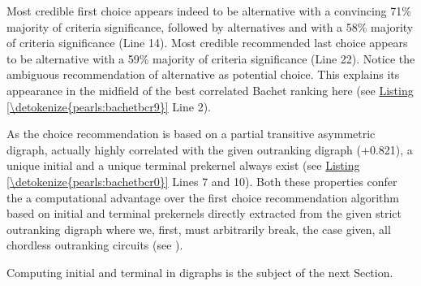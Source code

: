 \documentclass[a4paper,12pt,english]{sphinxhowto}
\begin{document}
\sphinxAtStartPar
Most credible first choice appears indeed to be alternative  with a convincing 71\% majority of criteria significance, followed by alternatives  and  with a 58\% majority of criteria significance (Line 14). Most credible recommended last choice appears to be  alternative  with a 59\% majority of criteria significance (Line 22). Notice the ambiguous recommendation of alternative  as potential    choice. This explains its appearance in the midfield of the best correlated Bachet ranking here (see \hyperref[\detokenize{pearls:bachetbcr9}]{Listing \ref{\detokenize{pearls:bachetbcr9}}} Line 2).

\sphinxAtStartPar
As the  choice recommendation is based on a partial transitive asymmetric digraph, actually highly correlated with the given outranking digraph  (+0.821), a unique initial and a unique terminal prekernel always exist (see \hyperref[\detokenize{pearls:bachetbcr0}]{Listing \ref{\detokenize{pearls:bachetbcr0}}} Lines 7 and 10). Both these properties confer the  a computational advantage over the  first choice recommendation algorithm based on initial and terminal prekernels directly extracted from the given strict outranking digraph where we, first, must arbitrarily break, the case given, all chordless outranking circuits (see ).

\sphinxAtStartPar
Computing initial and terminal  in digraphs is the subject of the next Section.
\end{document}
